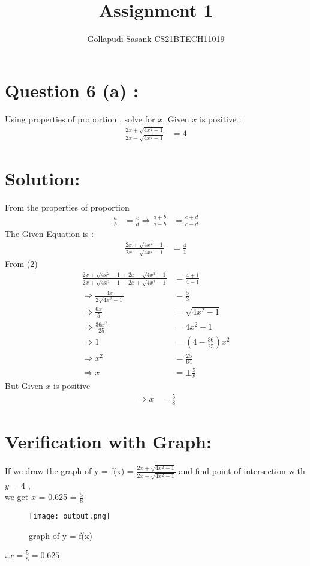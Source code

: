 \documentclass[twocolumn]{article}
\title{Assignment 1}
\author{Gollapudi Sasank CS21BTECH11019}
\providecommand{\brak}[1]{\ensuremath{\left(#1\right)}}
\begin{document}
\maketitle
\section*{ Question 6 (a) :}
\noindent Using properties of proportion , solve for $x$. Given $x$ is positive :
\begin{align}
\frac{2x+\sqrt{4x^2-1}}{2x-\sqrt{4x^2-1}} &= 4 
\end{align}
\section*{Solution:}
From the properties of proportion
\begin{align}
     \frac{a}{b}  &=  \frac{c}{d} 
     \Rightarrow 
     \frac{a+b}{a-b} &= \frac{c+d}{c-d}
     \end{align}
The Given Equation is :
    \begin{align}
        \frac{2x+\sqrt{4x^2-1}}{2x-\sqrt{4x^2-1}} &= \frac {4}{1}
        \end{align}
    From (2) 
    \begin{align}
      \frac {2x+\sqrt{4x^2-1}+2x-\sqrt{4x^2-1}}{2x+\sqrt{4x^2-1}-2x+\sqrt{4x^2-1}} &= \frac {4+1}{4-1} \\ \Rightarrow
        \frac{4x}{2\sqrt{4x^2-1}} &= \frac {5}{3} \\   \Rightarrow
        \frac{6x}{5} &= \sqrt{4x^2-1} \\  \Rightarrow
        \frac{36x^2}{25} &= 4x^2-1 \\   \Rightarrow
         1 &= \brak {4 - \frac{36}{25}}x^2 \\   \Rightarrow
        x^2 &=\frac{25}{64} \\   \Rightarrow
        x &= \pm\frac{5}{8} 
    \end{align}
But Given $x$ is positive 
\begin{align}
   \Rightarrow x &= \frac{5}{8}  
   \end{align}
\section*{Verification with Graph:} 
If we draw the graph of 
y = f(x) = $\frac{2x+\sqrt{4x^2-1}}{2x-\sqrt{4x^2-1}}$
 and find point of intersection with $y$ = 4 ,\\ we get $x$ = 0.625 = $\frac{5}{8}$ \\    
\begin{figure}[h!] 
\centering 
\texttt{[image: output.png]}
\caption{graph of y = f(x)}
\label{Fig 1}
\end{figure}
$\therefore x = \frac{5}{8} = 0.625 $
\end{document}
